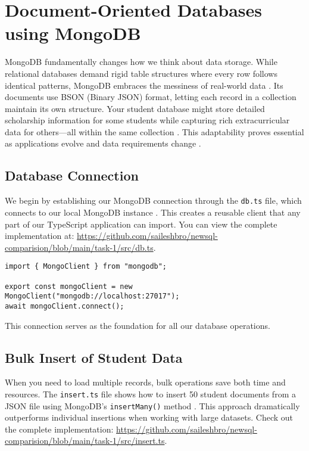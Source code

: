 \chapter{Document-Oriented Databases using MongoDB}

MongoDB fundamentally changes how we think about data storage. While relational databases demand rigid table structures where every row follows identical patterns, MongoDB embraces the messiness of real-world data \parencite{bson_specification}. Its documents use BSON (Binary JSON) format, letting each record in a collection maintain its own structure. Your student database might store detailed scholarship information for some students while capturing rich extracurricular data for others---all within the same collection \parencite{mongodb_definitive_guide}. This adaptability proves essential as applications evolve and data requirements change \parencite{mongodb_architecture}.

\section{Database Connection}
We begin by establishing our MongoDB connection through the \texttt{db.ts} file, which connects to our local MongoDB instance \parencite{typeScript_driver}. This creates a reusable client that any part of our TypeScript application can import. You can view the complete implementation at: \url{https://github.com/saileshbro/newsql-comparision/blob/main/task-1/src/db.ts}.

\begin{verbatim}
import { MongoClient } from "mongodb";

export const mongoClient = new MongoClient("mongodb://localhost:27017");
await mongoClient.connect();
\end{verbatim}

This connection serves as the foundation for all our database operations.

\section{Bulk Insert of Student Data}
When you need to load multiple records, bulk operations save both time and resources. The \texttt{insert.ts} file shows how to insert 50 student documents from a JSON file using MongoDB's \texttt{insertMany()} method \parencite{mongodb_definitive_guide}. This approach dramatically outperforms individual insertions when working with large datasets. Check out the complete implementation: \url{https://github.com/saileshbro/newsql-comparision/blob/main/task-1/src/insert.ts}.


